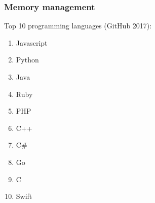 \begin{frame}
    \frametitle{Memory management}
    Top 10 programming languages (GitHub 2017):
    \begin{enumerate}
        \item {\color<2->{blue} Javascript}
        \item { Python}
        \item { Java}
        \item { Ruby}
        \item { PHP}
        \item { C++}
        \item {\color<2->{blue} C\#}
        \item { Go}
        \item { C}
        \item { Swift}
    \end{enumerate}
\end{frame}
